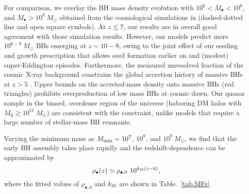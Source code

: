 \documentclass[twocolumn, twocolappendix]{aastex63}
\newcommand{\Msun}{M_\odot}
\newcommand{\Mh}{M_\mathrm{h}}
\newcommand{\fseed}{f_\mathrm{seed}}
\begin{document}
\begin{CJK*}{UTF8}{gbsn}
For comparison, we overlay the BH mass density evolution with $10^6<M_{\bullet}<10^8$, and $M_\bullet>10^8~\Msun$
obtained from the cosmological simulations in \citet{2022MNRAS.513..670N} (dashed-dotted line and open square symbols).
At $z\lesssim 7$, our results are in overall good agreement with those simulation results.
However, our models predict more $10^{6-8}~\Msun$ BHs emerging at $z\sim 10-8$,
owing to the joint effect of our seeding and growth prescription that allows seed formation earlier on 
and (modest) super-Eddington episodes.
Furthermore, the measured unresolved fraction of the cosmic X-ray background constrains
the global accretion history of massive BHs at $z>5$ \citep{2012A&A...545L...6S,2013ApJ...778..130T}.
Upper bounds on the accreted-mass density onto massive BHs (red triangles) prohibits overproduction of low mass BHs at cosmic dawn.
Our quasar sample in the biased, overdense region of the universe (haboring DM halos with $\Mh\gtrsim 10^{11}~\Msun$) 
are consistent with the constraint, unlike models that require a large number of stellar-mass BH remnants.





Varying the minimum mass as $M_{\rm min}=10^7$, $10^8$, and $10^9~\Msun$,
we find that the early BH assembly takes place rapidly and the redshift-dependence can be approximated by
%
\begin{equation}
\rho_\bullet(z)
\simeq \rho_{\bullet,0}~ 10^{k_{\rm M}(z-6)},
\end{equation}
%
where the fitted values of $\rho_{\bullet,0}$ and $k_{\rm M}$ are shown in Table.~\ref{tab:MFz}.


\end{CJK*}
\end{document}
